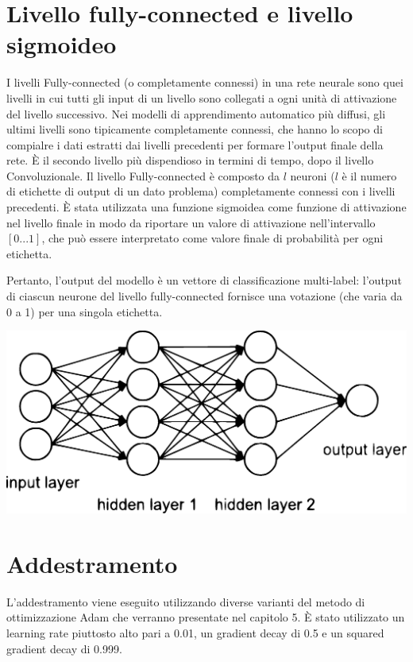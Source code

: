 \section{Livello fully-connected e livello sigmoideo}
I livelli Fully-connected (o completamente connessi) in una rete neurale sono quei livelli in cui tutti gli input di un livello sono collegati a ogni unità di attivazione del livello successivo. Nei modelli di apprendimento  automatico più diffusi, gli ultimi livelli sono tipicamente completamente connessi, che hanno lo scopo di compialre i dati estratti dai livelli precedenti per formare l'output finale della rete. È il secondo livello più dispendioso in termini di tempo, dopo il livello Convoluzionale.
Il livello Fully-connected è composto da $l$ neuroni ($l$ è il numero di etichette di output di un dato problema) completamente connessi con i livelli precedenti. È stata utilizzata una funzione sigmoidea come funzione di attivazione nel livello finale in modo da riportare un valore di attivazione nell'intervallo $[0...1]$, che può essere interpretato come valore finale di probabilità per ogni etichetta. 

Pertanto, l'output del modello è un vettore di classificazione multi-label: l'output di ciascun neurone del livello fully-connected fornisce una votazione (che varia da 0 a 1) per una singola etichetta.

\vspace{0.25cm} 
\begin{center}
	\includegraphics[scale=0.4]{images/neural_net2.eps}
	\label{Figura 1.}
\end{center}
\vspace{0.25cm}

\section{Addestramento}
L'addestramento viene eseguito utilizzando diverse varianti del metodo di ottimizzazione Adam che verranno presentate nel capitolo 5. È stato utilizzato un learning rate piuttosto alto pari a 0.01, un gradient decay di 0.5 e un squared gradient decay di 0.999.

